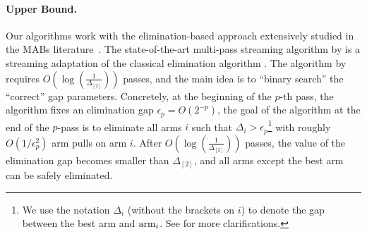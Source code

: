 	\paragraph{Upper Bound.} Our algorithms work with the elimination-based approach extensively studied in the MABs literature~\cite{HKK+13,KZZ20}. %
The state-of-the-art multi-pass streaming algorithm by \cite{JinH0X21} is a streaming adaptation of the classical elimination algorithm \cite{KarninKS13}. %
	The algorithm by \cite{JinH0X21} requires \(O\left(\log \left(\frac{1}{\Delta_{[2]}}\right)\right)\) passes, and the main idea is to ``binary search'' the ``correct'' gap parameters.
	Concretely, at the beginning of the $p$-th pass, the algorithm fixes an elimination gap \(\epsilon_p = O(2^{-p})\), the goal of the algorithm at the end of the \(p\)-pass is to eliminate all arms \(i\) such that \(\Delta_i > \epsilon_p\)\footnote{We use the notation $\Delta_{i}$ (without the brackets on $i$) to denote the gap between the best arm and $\textnormal{arm}_{i}$. See  for more clarifications.} with roughly \(O({1}/{\epsilon^2_p})\) arm pulls on arm $i$. 
	After \(O\left(\log \left(\frac{1}{\Delta_{[2]}}\right)\right)\) passes, the value of the elimination gap becomes smaller than \(\Delta_{[2]}\), and all arms except the best arm can be safely eliminated. %
	
